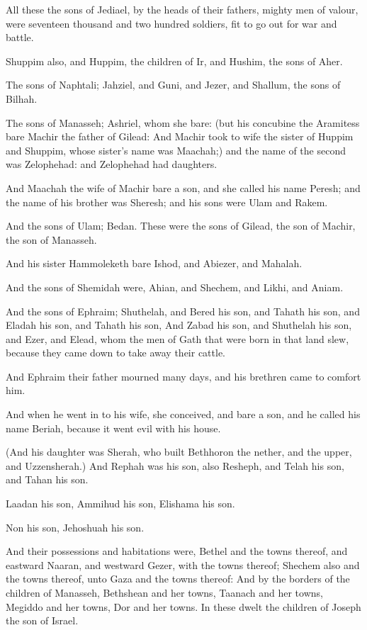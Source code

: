 \Verse All these the sons of Jediael, by the heads of their fathers, mighty men of valour, were seventeen thousand and two hundred soldiers, fit to go out for war and battle.

\Verse Shuppim also, and Huppim, the children of Ir, and Hushim, the sons of Aher.

\Verse The sons of Naphtali; Jahziel, and Guni, and Jezer, and Shallum, the sons of Bilhah.

\Verse The sons of Manasseh; Ashriel, whom she bare: (but his concubine the Aramitess bare Machir the father of Gilead: \Verse And Machir took to wife the sister of Huppim and Shuppim, whose sister's name was Maachah;) and the name of the second was Zelophehad: and Zelophehad had daughters.

\Verse And Maachah the wife of Machir bare a son, and she called his name Peresh; and the name of his brother was Sheresh; and his sons were Ulam and Rakem.

\Verse And the sons of Ulam; Bedan. These were the sons of Gilead, the son of Machir, the son of Manasseh.

\Verse And his sister Hammoleketh bare Ishod, and Abiezer, and Mahalah.

\Verse And the sons of Shemidah were, Ahian, and Shechem, and Likhi, and Aniam.

\Verse And the sons of Ephraim; Shuthelah, and Bered his son, and Tahath his son, and Eladah his son, and Tahath his son, \Verse And Zabad his son, and Shuthelah his son, and Ezer, and Elead, whom the men of Gath that were born in that land slew, because they came down to take away their cattle.

\Verse And Ephraim their father mourned many days, and his brethren came to comfort him.

\Verse And when he went in to his wife, she conceived, and bare a son, and he called his name Beriah, because it went evil with his house.

\Verse (And his daughter was Sherah, who built Bethhoron the nether, and the upper, and Uzzensherah.)  \Verse And Rephah was his son, also Resheph, and Telah his son, and Tahan his son.

\Verse Laadan his son, Ammihud his son, Elishama his son.

\Verse Non his son, Jehoshuah his son.

\Verse And their possessions and habitations were, Bethel and the towns thereof, and eastward Naaran, and westward Gezer, with the towns thereof; Shechem also and the towns thereof, unto Gaza and the towns thereof: \Verse And by the borders of the children of Manasseh, Bethshean and her towns, Taanach and her towns, Megiddo and her towns, Dor and her towns. In these dwelt the children of Joseph the son of Israel.

